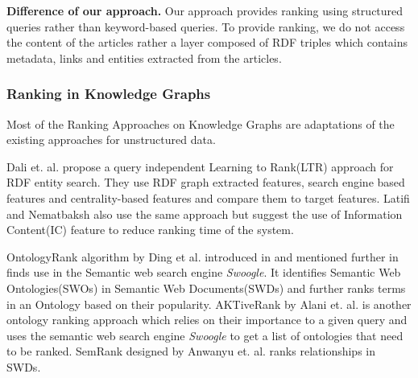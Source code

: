 
\noindent \textbf{Difference of our approach.} Our approach
provides ranking using structured queries rather than
keyword-based queries.
To provide ranking, we do not access
the content of the articles rather a
layer composed of RDF triples which
contains metadata, links and entities
extracted from the articles.

\subsubsection*{Ranking in Knowledge Graphs}
\label{graph_ranking}

Most of the Ranking Approaches on Knowledge Graphs
are adaptations
of the existing approaches for unstructured data.

Dali et. al.\cite{dali2012query} propose a query
independent Learning to Rank(LTR) approach
for RDF entity search. They use RDF graph extracted features,
search engine based features
and centrality-based features and compare them to target features.
Latifi and Nematbaksh\cite{latifi2014query} also use
the same approach
but suggest the use of Information Content(IC) feature
to reduce ranking time of the system.

OntologyRank algorithm by Ding et al. introduced
in \cite{ding2004swoogle} and mentioned
further in \cite{ding2005finding}
finds use in the Semantic web search engine \emph{Swoogle}.
It identifies Semantic Web Ontologies(SWOs) in Semantic Web
Documents(SWDs) and further ranks terms in an Ontology based on their popularity.
AKTiveRank\cite{alani2006ranking} by Alani et. al.
is another ontology ranking approach which relies
on their importance to a given query
and uses the semantic web search engine
\emph{Swoogle}\cite{ding2005finding} to get a list
of ontologies that need to be ranked.
SemRank\cite{anyanwu2005semrank} designed by
Anwanyu et. al. ranks relationships in SWDs.

